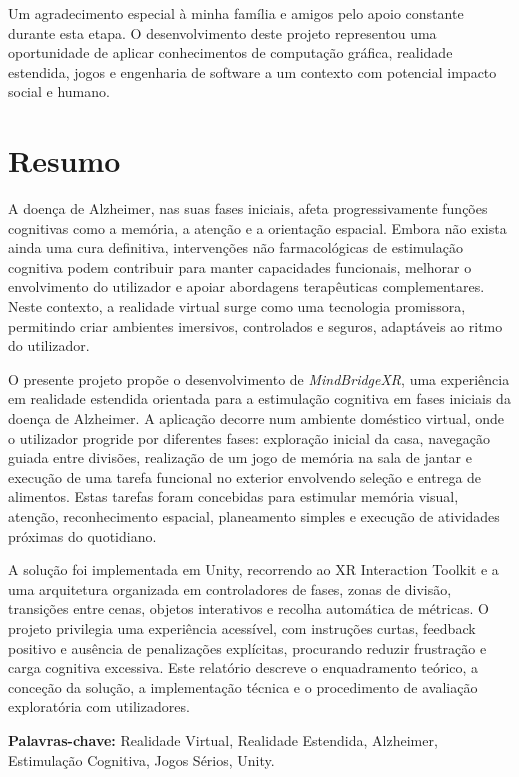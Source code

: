 \documentclass[12pt,a4paper,oneside]{report}
\newcommand{\blankpage}{
    \clearpage
    \thispagestyle{empty}
    \null
    \clearpage
}
\begin{document}
Um agradecimento especial à minha família e amigos pelo apoio constante durante esta etapa. O desenvolvimento deste projeto representou uma oportunidade de aplicar conhecimentos de computação gráfica, realidade estendida, jogos e engenharia de software a um contexto com potencial impacto social e humano.

\blankpage

\chapter*{Resumo}

A doença de Alzheimer, nas suas fases iniciais, afeta progressivamente funções cognitivas como a memória, a atenção e a orientação espacial. Embora não exista ainda uma cura definitiva, intervenções não farmacológicas de estimulação cognitiva podem contribuir para manter capacidades funcionais, melhorar o envolvimento do utilizador e apoiar abordagens terapêuticas complementares. Neste contexto, a realidade virtual surge como uma tecnologia promissora, permitindo criar ambientes imersivos, controlados e seguros, adaptáveis ao ritmo do utilizador.

O presente projeto propõe o desenvolvimento de \textit{MindBridgeXR}, uma experiência em realidade estendida orientada para a estimulação cognitiva em fases iniciais da doença de Alzheimer. A aplicação decorre num ambiente doméstico virtual, onde o utilizador progride por diferentes fases: exploração inicial da casa, navegação guiada entre divisões, realização de um jogo de memória na sala de jantar e execução de uma tarefa funcional no exterior envolvendo seleção e entrega de alimentos. Estas tarefas foram concebidas para estimular memória visual, atenção, reconhecimento espacial, planeamento simples e execução de atividades próximas do quotidiano.

A solução foi implementada em Unity, recorrendo ao XR Interaction Toolkit e a uma arquitetura organizada em controladores de fases, zonas de divisão, transições entre cenas, objetos interativos e recolha automática de métricas. O projeto privilegia uma experiência acessível, com instruções curtas, feedback positivo e ausência de penalizações explícitas, procurando reduzir frustração e carga cognitiva excessiva. Este relatório descreve o enquadramento teórico, a conceção da solução, a implementação técnica e o procedimento de avaliação exploratória com utilizadores.

\textbf{Palavras-chave:} Realidade Virtual, Realidade Estendida, Alzheimer, Estimulação Cognitiva, Jogos Sérios, Unity.
\end{document}
